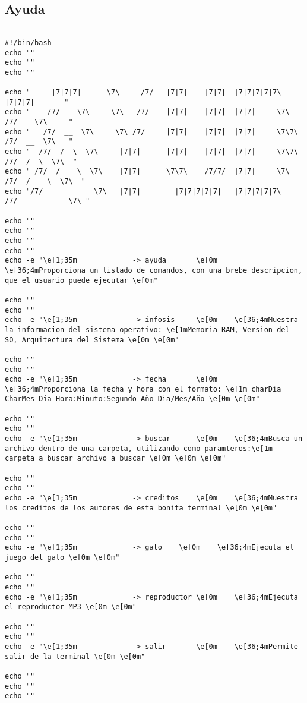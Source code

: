 \documentclass{article}
\begin{document}
\subsection{Ayuda}
\fontsize{4}{4.5}\selectfont
\begin{verbatim}

#!/bin/bash
echo ""
echo ""
echo ""

echo "     |7|7|7|      \7\     /7/   |7|7|    |7|7|  |7|7|7|7|7\           |7|7|7|       " 
echo "    /7/    \7\     \7\   /7/    |7|7|    |7|7|  |7|7|     \7\        /7/    \7\     "
echo "   /7/  __  \7\     \7\ /7/     |7|7|    |7|7|  |7|7|     \7\7\     /7/  __  \7\   "
echo "  /7/  /  \  \7\     |7|7|      |7|7|    |7|7|  |7|7|     \7\7\    /7/  /  \  \7\  "
echo " /7/  /____\  \7\    |7|7|      \7\7\    /7/7/  |7|7|     \7\     /7/  /____\  \7\  "
echo "/7/            \7\   |7|7|        |7|7|7|7|7|   |7|7|7|7|7\      /7/            \7\ "

echo ""
echo ""
echo ""
echo ""
echo -e "\e[1;35m             -> ayuda       \e[0m    \e[36;4mProporciona un listado de comandos, con una brebe descripcion, que el usuario puede ejecutar \e[0m"

echo ""
echo ""
echo -e "\e[1;35m             -> infosis     \e[0m    \e[36;4mMuestra la informacion del sistema operativo: \e[1mMemoria RAM, Version del SO, Arquitectura del Sistema \e[0m \e[0m"

echo ""
echo ""
echo -e "\e[1;35m             -> fecha       \e[0m    \e[36;4mProporciona la fecha y hora con el formato: \e[1m charDia CharMes Dia Hora:Minuto:Segundo Año Dia/Mes/Año \e[0m \e[0m"

echo ""
echo ""
echo -e "\e[1;35m             -> buscar      \e[0m    \e[36;4mBusca un archivo dentro de una carpeta, utilizando como paramteros:\e[1m carpeta_a_buscar archivo_a_buscar \e[0m \e[0m \e[0m"

echo ""
echo ""
echo -e "\e[1;35m             -> creditos    \e[0m    \e[36;4mMuestra los creditos de los autores de esta bonita terminal \e[0m \e[0m"

echo ""
echo ""
echo -e "\e[1;35m             -> gato    \e[0m    \e[36;4mEjecuta el juego del gato \e[0m \e[0m"

echo ""
echo ""
echo -e "\e[1;35m             -> reproductor \e[0m    \e[36;4mEjecuta el reproductor MP3 \e[0m \e[0m"

echo ""
echo ""
echo -e "\e[1;35m             -> salir       \e[0m    \e[36;4mPermite salir de la terminal \e[0m \e[0m"

echo ""
echo ""
echo ""

\end{verbatim}
\end{document}

